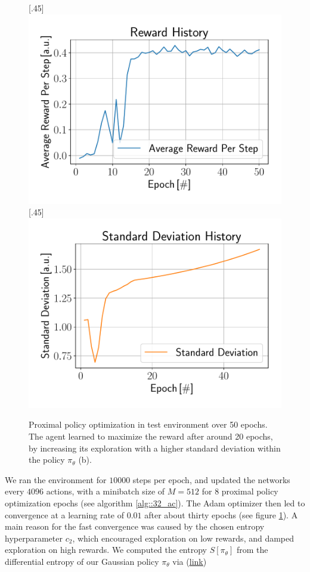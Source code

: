 \begin{figure}[h!]
	\centering
	[.45\linewidth]{\includegraphics[scale=.35]{chapters/11_autonomous_walking_experiments/img/ppo_reward_history.pdf}}	
	[.45\linewidth]{\includegraphics[scale=.35]{chapters/11_autonomous_walking_experiments/img/ppo_std_history.pdf}}
	\caption{Proximal policy optimization in test environment over 50 epochs. The agent learned to maximize the reward after around 20 epochs, by increasing its exploration with a higher standard deviation within the policy $\pi_\theta$ (b).}	
	\label{fig::431_ppo_hist}
\end{figure}
We ran the environment for $10000$ steps per epoch, and updated the networks every $4096$ actions, with a minibatch size of $M=512$ for $8$ proximal policy optimization epochs (see algorithm \ref{alg::32_ac}). The Adam optimizer then led to convergence at a learning rate of $0.01$ after about thirty epochs (see figure \ref{fig::431_ppo_hist}). A main reason for the fast convergence was caused by the chosen entropy hyperparameter $c_2$, which encouraged exploration on low rewards, and damped exploration on high rewards. We computed the entropy $S[\pi_\theta]$ from the differential entropy of our Gaussian policy $\pi_\theta$ via (\href{https://github.com/mhubii/ppo_libtorch/blob/481c1e326dcd6220b2c1c955a0303a410c2cb0dd/Models.h#L82}{\underline{link}})
